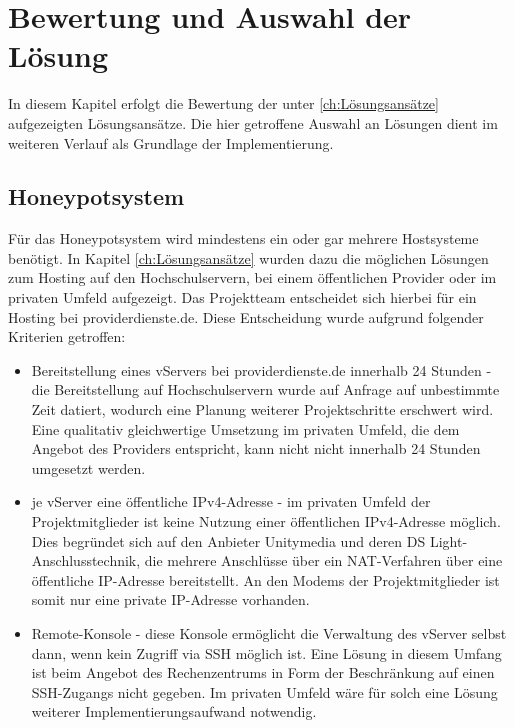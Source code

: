 \chapter{Bewertung und Auswahl der Lösung}
\label{ch:Bewertung und Auswahl der Lösung}

In diesem Kapitel erfolgt die Bewertung der unter \ref{ch:Lösungsansätze} aufgezeigten Lösungsansätze. Die hier getroffene Auswahl an Lösungen dient im weiteren Verlauf als Grundlage der Implementierung.\\

\section{Honeypotsystem}
\label{sec:Honeypotsystem}

Für das Honeypotsystem wird mindestens ein oder gar mehrere Hostsysteme benötigt. In Kapitel \ref{ch:Lösungsansätze} wurden dazu die möglichen Lösungen zum Hosting auf den Hochschulservern, bei einem öffentlichen Provider oder im privaten Umfeld aufgezeigt. Das Projektteam entscheidet sich hierbei für ein Hosting bei providerdienste.de. Diese Entscheidung wurde aufgrund folgender Kriterien getroffen:

\begin{itemize}
\item Bereitstellung eines vServers bei providerdienste.de innerhalb 24 Stunden - die Bereitstellung auf Hochschulservern wurde auf Anfrage auf unbestimmte Zeit datiert, wodurch eine Planung weiterer Projektschritte erschwert wird. Eine qualitativ gleichwertige Umsetzung im privaten Umfeld, die dem Angebot des Providers entspricht, kann nicht nicht innerhalb 24 Stunden umgesetzt werden.
\item je vServer eine öffentliche IPv4-Adresse - im privaten Umfeld der Projektmitglieder ist keine Nutzung einer öffentlichen IPv4-Adresse möglich. Dies begründet sich auf den Anbieter Unitymedia und deren DS Light-Anschlusstechnik, die mehrere Anschlüsse über ein NAT-Verfahren über eine öffentliche IP-Adresse bereitstellt. An den Modems der Projektmitglieder ist somit nur eine private IP-Adresse vorhanden.
\item Remote-Konsole - diese Konsole ermöglicht die Verwaltung des vServer selbst dann, wenn kein Zugriff via SSH möglich ist. Eine Lösung in diesem Umfang ist beim Angebot des Rechenzentrums in Form der Beschränkung auf einen SSH-Zugangs nicht gegeben. Im privaten Umfeld wäre für solch eine Lösung weiterer Implementierungsaufwand notwendig.
\end{itemize}

